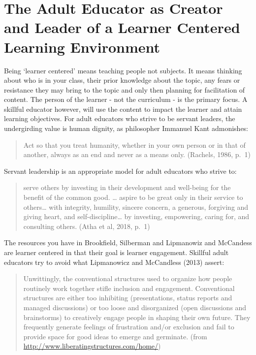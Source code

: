 \documentclass[
]{book}
\begin{document}
\hypertarget{the-adult-educator-as-creator-and-leader-of-a-learner-centered-learning-environment}{%
\section{The Adult Educator as Creator and Leader of a Learner Centered Learning Environment}\label{the-adult-educator-as-creator-and-leader-of-a-learner-centered-learning-environment}}

Being `learner centered' means teaching people not subjects. It means
thinking about who is in your class, their prior knowledge about the
topic, any fears or resistance they may bring to the topic and only then
planning for facilitation of content. The person of the learner - not
the curriculum - is the primary focus. A skillful educator however, will
use the content to impact the learner and attain learning objectives.
For adult educators who strive to be servant leaders, the undergirding
value is human dignity, as philosopher Immanuel Kant admonishes:

\begin{quote}
Act so that you treat humanity, whether in your own person or in that of another, always as an end and never as a means only. (Rachels, 1986, p.~1)
\end{quote}

Servant leadership is an appropriate model for adult educators who
strive to:

\begin{quote}
serve others by investing in their development and well-being for the benefit of the common good. \ldots{} aspire to be great only in their service to others\ldots{} with integrity, humility, sincere concern, a generous, forgiving and giving heart, and self-discipline\ldots{} by investing, empowering, caring for, and consulting others. (Atha et al, 2018, p.~1)
\end{quote}

The resources you have in Brookfield, Silberman and Lipmanowiz and
McCandess are learner centered in that their goal is learner engagement.
Skillful adult educators try to avoid what Lipmanowicz and McCandless
(2013) assert:

\begin{quote}
Unwittingly, the conventional structures used to organize how people routinely work together stifle inclusion and engagement. Conventional structures are either too inhibiting (presentations, status reports and managed discussions) or too loose and disorganized (open discussions and brainstorms) to creatively engage people in shaping their own future. They frequently generate feelings of frustration and/or exclusion and fail to provide space for good ideas to emerge and germinate. (from \url{http://www.liberatingstructures.com/home/})
\end{quote}
\end{document}
